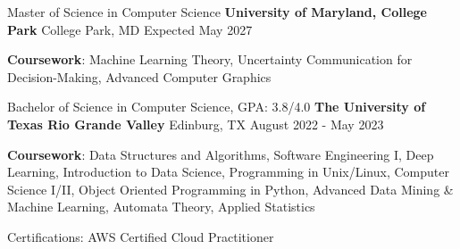 
\begin{cventries}
  \cventry
    {Master of Science in Computer Science} %
    {\textbf{University of Maryland, College Park}} %
    {College Park, MD} %
    {Expected May 2027} %
    {
      \begin{cvitems} %
         \item {\textbf{Coursework}: Machine Learning Theory, Uncertainty Communication for Decision-Making, Advanced Computer Graphics}
      \end{cvitems}
      \dotfill
    }

  \cventry
    {Bachelor of Science in Computer Science, GPA: 3.8/4.0} %
    {\textbf{The University of Texas Rio Grande Valley}} %
    {Edinburg, TX} %
    {August 2022 - May 2023} %
    {
      \begin{cvitems} %
         \item {\textbf{Coursework}: Data Structures and Algorithms, Software Engineering I, Deep Learning, Introduction to Data Science, Programming in Unix/Linux, Computer Science I/II, Object Oriented Programming in Python, Advanced Data Mining \& Machine Learning, Automata Theory, Applied Statistics}
      \end{cvitems}
    }

\end{cventries}

\begin{cvawards}
  \cvaward
    {Certifications:} %
    {AWS Certified Cloud Practitioner } %

\end{cvawards}
